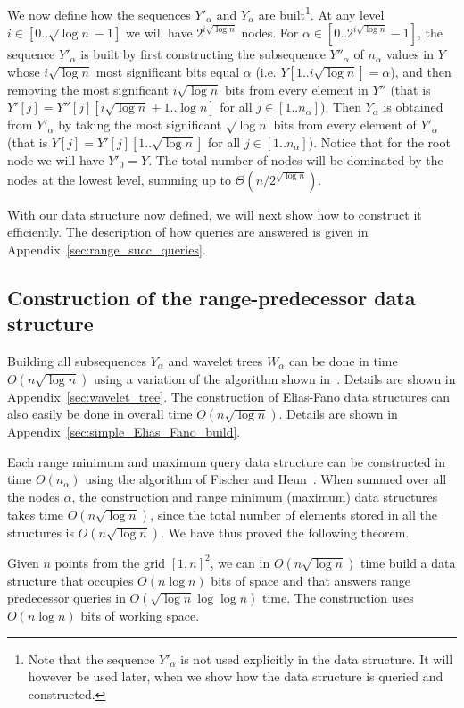 \documentclass[11pt,runningheads]{llncs}
\begin{document}
We now define how the sequences $Y'_\alpha$ and $Y_\alpha$ 
are built\footnote{Note that the sequence $Y'_\alpha$ is not used 
explicitly in the data structure. It will however be used later, 
when we show how the data structure is queried and constructed.}. 
At any level $i\in[0..\sqrt{\log n}-1]$ we will have $2^{i\sqrt{\log n}}$
nodes. For $\alpha\in[0..2^{i\sqrt{\log n}}-1]$, the sequence $Y'_\alpha$
is built by first constructing the subsequence $Y''_\alpha$ of $n_\alpha$ values in $Y$ whose $i\sqrt{\log n}$
most significant bits equal $\alpha$ (i.e. $Y[1..i\sqrt{\log n}]=\alpha$), 
and then removing the most significant $i\sqrt{\log n}$ bits from every element in $Y''$
(that is $Y'[j]=Y''[j][i\sqrt{\log n}+1..\log n]$ for all 
$j\in[1..n_\alpha]$). 
Then $Y_\alpha$ is obtained from 
$Y'_\alpha$ by taking the most significant $\sqrt{\log n}$ bits from every element 
of $Y'_\alpha$ (that is $Y[j]=Y'[j][1..\sqrt{\log n}]$ for all 
$j\in[1..n_\alpha]$). Notice that for the root node we will have $Y'_0=Y$. 
The total number of nodes will be dominated by the nodes at the lowest level, 
summing up to $\Theta(n/2^{\sqrt{\log n}})$. 

With our data structure now defined, we will next show how to construct it efficiently. 
The description of how queries are answered is given in Appendix~\ref{sec:range_succ_queries}. 

\subsection{Construction of the range-predecessor data structure}

Building all subsequences $Y_\alpha$ and wavelet trees $W_\alpha$ can be done in time $O(n\sqrt{\log n})$
using a variation of the algorithm shown in~\cite{MNV14,BGKS15}. Details are shown in 
Appendix~\ref{sec:wavelet_tree}. The construction of Elias-Fano data structures can also 
easily be done in overall time $O(n\sqrt{\log n})$. Details are shown in Appendix~\ref{sec:simple_Elias_Fano_build}.

Each range minimum and maximum query data structure 
can be constructed in time $O(n_\alpha)$ using the algorithm of Fischer and Heun~\cite{FischerH11}.
When summed over all the nodes $\alpha$, the construction  
and range minimum (maximum) data structures takes time $O(n\sqrt{\log n})$, since the total 
number of elements stored in all the structures is $O(n\sqrt{\log n})$. 
We have thus proved the following theorem.

\begin{theorem}
\label{range_pred_theo1}
Given $n$ points from the grid $[1,n]^2$, we can in 
$O(n\sqrt{\log n})$ time build a data structure that occupies 
$O(n\log n)$ bits of space and that answers 
range predecessor queries in $O(\sqrt{\log n}\log\log n)$ time.
The construction uses $O(n\log n)$ bits of working space. 
\end{theorem}
\end{document}
